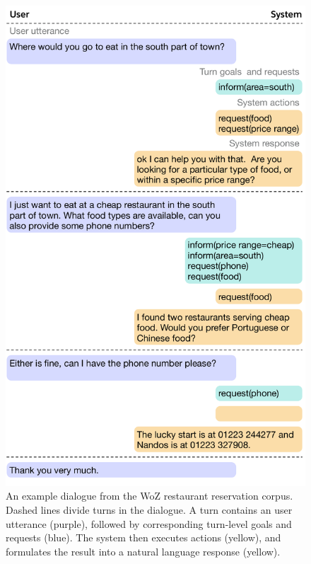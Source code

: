 \documentclass[11pt,a4paper]{article}
\begin{document}
\begin{figure}[!t]
\centering
\includegraphics[width=\linewidth]{figures/dialogue.pdf}
\caption{
An example dialogue from the WoZ restaurant reservation corpus.
Dashed lines divide turns in the dialogue.
A turn contains an user utterance (purple), followed by corresponding turn-level goals and requests (blue).
The system then executes actions (yellow), and formulates the result into a natural language response (yellow).
}
\label{fig:dialogue}
\end{figure}





\end{document}
